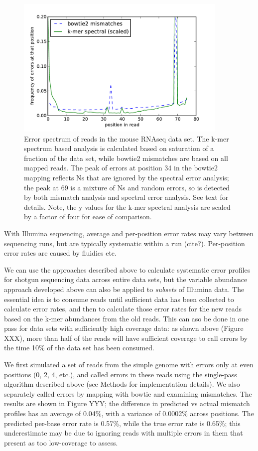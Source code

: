 \documentclass{article}
\begin{document}
\begin{figure}[!ht]
 \centerline{\includegraphics[width=4in]{./figures/rseq-errhist}}
\caption{Error spectrum of reads in the mouse RNAseq data set. The
  k-mer spectrum based analysis is calculated based on saturation of a
  fraction of the data set, while bowtie2 mismatches are based on all
  mapped reads. The peak of errors at position 34 in the bowtie2
  mapping reflects Ns that are ignored by the spectral error analysis;
  the peak at 69 is a mixture of Ns and random errors, so is detected
  by both mismatch analysis and spectral error analysis.  See text for
  details.  Note, the y values for the k-mer spectral analysis are
  scaled by a factor of four for ease of comparison.  }
\label{fig:rseq_err}
\end{figure}

With Illumina sequencing, average and per-position error rates may
vary between sequencing runs, but are typically systematic within a
run (cite?).  Per-position error rates are caused by fluidics etc.

We can use the approaches described above to calculate systematic
error profiles for shotgun sequencing data across entire data sets,
but the variable abundance approach developed above can also be
applied to {\em subsets} of Illumina data.  The essential idea is to
consume reads until sufficient data has been collected to calculate
error rates, and then to calculate those error rates for the new reads
based on the k-mer abundances from the old reads.  This can aso be
done in one pass for data sets with sufficiently high coverage data:
as shown above (Figure XXX), more than half of the reads will have
sufficient coverage to call errors by the time 10\% of the data set
has been consumed.

We first simulated a set of reads from the simple genome with errors
only at even positions (0, 2, 4, etc.), and called errors in these
reads using the single-pass algorithm described above (see Methods for
implementation details).  We also separately called errors by mapping
with bowtie and examining mismatches.  The results are shown in Figure
YYY; the difference in predicted vs actual mismatch profiles has an
average of 0.04\%, with a variance of 0.0002\% across positions.  The
predicted per-base error rate is 0.57\%, while the true error rate is
0.65\%; this underestimate may be due to ignoring reads with multiple
errors in them that present as too low-coverage to assess.
\end{document}
